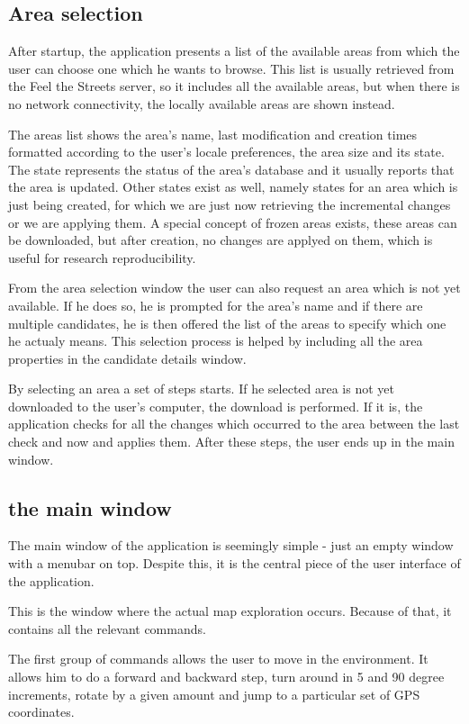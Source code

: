 \documentclass[nolof,digital]{fithesis3}
\begin{document}
\subsection{Area selection}
After startup, the application presents a list of the available areas from which the user can choose one which he wants to browse. This list is usually retrieved from the Feel the Streets server, so it includes all the available areas, but when there is no network connectivity, the locally available areas are shown instead.

The areas list shows the area's name, last modification and creation times formatted according to the user's locale preferences, the area size and its state. The state represents the status of the area's database and it usually reports that the area is updated. Other states exist as well, namely states for an area which is just being created, for which we are just now retrieving the incremental changes or we are applying them. A special concept of frozen areas exists, these areas can be downloaded, but after creation, no changes are applyed on them, which is useful for research reproducibility.

From the area selection window the user can also request an area which is not yet available. If he does so, he is prompted for the area's name and if there are multiple candidates, he is then offered the list of the areas to specify which one he actualy means. This selection process is helped by including all the area properties in the candidate details window.

By selecting an area a set of steps starts. If he selected area is not yet downloaded to the user's computer, the download is performed. If it is, the application checks for all the changes which occurred to the area between the last check and now and applies them. After these steps, the user ends up in the main window.
\subsection{the main window}
The main window of the application is seemingly simple - just an empty window with a menubar on top. Despite this, it is the central piece of the user interface of the application.

This is the window where the actual map exploration occurs. Because of that, it contains all the relevant commands.

The first group of commands allows the user to move in the environment. It allows him to do a forward and backward step, turn around in 5 and 90 degree increments, rotate by a given amount and jump to a particular set of GPS coordinates.
\end{document}

